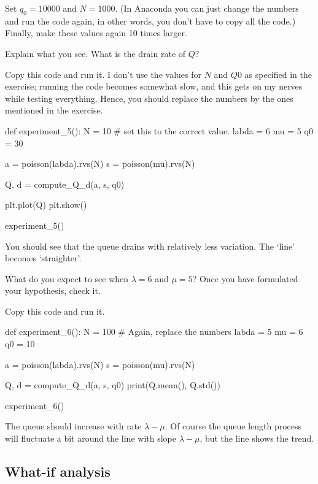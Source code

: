 \begin{exercise}
Set $q_0=10000$ and $N=1000$.  (In Anaconda you can just change the numbers and run the code again, in other words, you don't have to copy all the code.) Finally,  make these values again 10 times larger.

Explain what you see. What is the drain rate of $Q$?
\begin{solution}
  Copy this code and run it.
  I don't use the values for $N$ and $Q0$ as specified in the exercise; running the code becomes somewhat slow, and this gets on my nerves while testing everything.
  Hence, you should replace the numbers by the ones mentioned in the exercise.

\begin{pyverbatim}
def experiment_5():
    N = 10  # set this to the correct value.
    labda = 6
    mu = 5
    q0 = 30

    a = poisson(labda).rvs(N)
    s = poisson(mu).rvs(N)

    Q, d = compute_Q_d(a, s, q0)

    plt.plot(Q)
    plt.show()


experiment_5()
\end{pyverbatim}

You should see that the queue drains with relatively less variation. The `line' becomes `straighter'.
\end{solution}
\end{exercise}

\begin{exercise}
What do you expect to see when $\lambda=6$ and $\mu=5$? Once you have formulated your hypothesis, check it.
\begin{solution}
Copy this code and run it.
\begin{pyverbatim}
def experiment_6():
    N = 100 #  Again, replace the numbers
    labda = 5
    mu = 6
    q0 = 10

    a = poisson(labda).rvs(N)
    s = poisson(mu).rvs(N)

    Q, d = compute_Q_d(a, s, q0)
    print(Q.mean(), Q.std())

experiment_6()
\end{pyverbatim}
  The queue should increase with rate $\lambda - \mu$. Of course the queue length process will fluctuate a bit around the line with slope $\lambda-\mu$, but the line shows the trend.
\end{solution}
\end{exercise}

\subsection{What-if analysis}
\label{sec:what-if-analysis}

